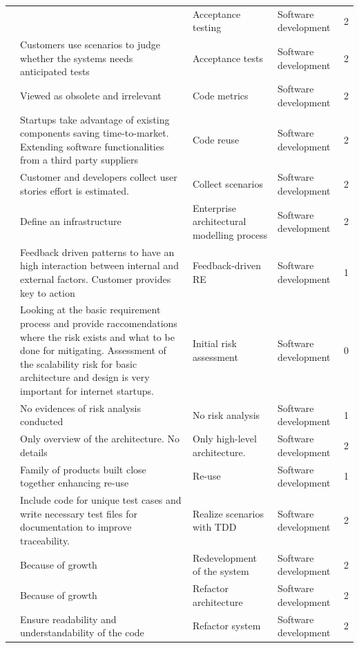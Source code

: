 \documentclass[final,5p,times,twocolumn]{elsarticle}
\begin{document}
\begin{center}
\begin{longtable}{|p{0.4in}|p{3in}|p{1.3in}|p{1in}|p{0.3in}|}
\cite{Kajko-Mattsson2008} &       & Acceptance testing & Software development & 2 \\
\cite{Zettel2001} & Customers use scenarios to judge whether the systems needs anticipated tests & Acceptance tests & Software development & 2 \\
\cite{Zettel2001} & Viewed as obsolete and irrelevant & Code metrics & Software development & 2 \\
\cite{Jansen2008} & Startups take advantage of existing components saving time-to-market. Extending software functionalities from a third party suppliers & Code reuse & Software development & 2 \\
\cite{Zettel2001} & Customer and developers collect user stories effort is estimated. & Collect scenarios & Software development & 2 \\
\cite{Ambler2002} & Define an infrastructure & Enterprise architectural modelling process & Software development & 2 \\
\cite{Midler2008} & Feedback driven patterns to have an high interaction between internal and external factors. Customer provides key to action & Feedback-driven RE & Software development & 1 \\
\cite{Mater2000} & Looking at the basic requirement process and provide raccomendations where the risk exists and what to be done for mitigating. Assessment of the scalability risk for basic architecture and design is very important for internet startups. & Initial risk assessment & Software development & 0 \\
\cite{Camel1994a} & No evidences of risk analysis conducted & No risk analysis & Software development & 1 \\
\cite{Ambler2002} & Only overview of the architecture. No details & Only high-level architecture. & Software development & 2 \\
\cite{Camel1994a} & Family of products built close together enhancing re-use & Re-use & Software development & 1 \\
\cite{Zettel2001} & Include code for unique test cases and write necessary test files for documentation to improve traceability. & Realize scenarios with TDD & Software development & 2 \\
\cite{Ambler2002} & Because of growth & Redevelopment of the system & Software development & 2 \\
\cite{Ambler2002} & Because of growth & Refactor architecture & Software development & 2 \\
\cite{Zettel2001} & Ensure readability and understandability of the code & Refactor system & Software development & 2 \\

\end{longtable}
\end{center}
\end{document}
